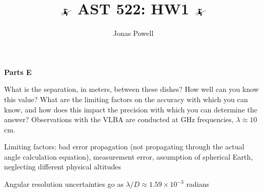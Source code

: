\documentclass[12pt]{article}
\begin{document}

\title{$\mathwitch$ AST 522: HW1 $\mathwitch$}
\author{Jonas Powell}
\maketitle




\bigskip
\bigskip
\textbf{Parts E}\\
\bigskip

What is the separation, in meters, between these dishes? How well can you know
this value? What are the limiting factors on the accuracy with which you can know, and
how does this impact the precision with which you can determine the answer?
Observations with the VLBA are conducted at GHz frequencies, $\lambda \approx 10$ cm.

\bigskip


Limiting factors: bad error propagation (not propagating through the actual angle calculation equation), measurement error, assumption of spherical Earth, neglecting different physical altitudes

\bigskip

Angular resolution uncertainties go as $\lambda/D \approx 1.59 \times 10^{-3}$ radians


\bigskip
\bigskip
\end{document}
